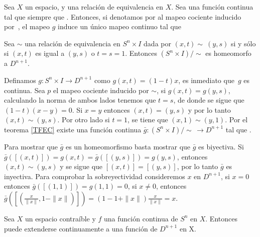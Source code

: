 \begin{Teo}\label{TFEC}
Sea $X$ un espacio, y \mm{\sim} una relación de equivalencia en
$X$. Sea  una función continua tal que
 siempre que . Entonces, si denotamos por
 al mapeo cociente inducido
por~\mm{\sim}, el mapeo $g$ induce un único mapeo continuo
 tal que 
\end{Teo}
\begin{Lema}\label{lemah}
Sea $\sim$ una relación de equivalencia en $S^n\times I$ dada por $(x,t)\sim ~(y,s)$ si y sólo si $(x,t)$ es igual a $(y,s)$ o $t \!=\! s \!=\! 1$. Entonces $(S^n\times I)/\!\!\sim$ es homeomorfo a $D^{n+1}$.
\end{Lema}
\begin{Dem}

Definamos $g\colon S^n\times I\rightarrow D^{n+1}$ como $g(x,t) =
(1-t)x$, es inmediato que~$g$ es continua. Sea $p$ el mapeo cociente inducido por $\sim$, si $g(x,t) = g(y,s)$, calculando la norma de ambos lados tenemos que  $t = s$, de donde se sigue que $(1-t)(x-y)=0$. Si $x = y$ entonces $(x,t) = (y,s)$ y por lo tanto $(x,t)\sim (y,s)$. Por otro lado si $t = 1$, se tiene que $(x,1)\sim(y,1)$.
Por el teorema \ref{TFEC} existe una función continua $\bar{g}\colon (S^n\times I)/\!\!\!\sim\,\rightarrow D^{n+1}$ tal que .

Para mostrar que $\bar{g}$ es un homeomorfismo basta mostrar que $\bar{g}$ es biyectiva.
Si  $\bar{g}([(x,t)]) =g(x,t)= \bar{g}([(y,s)]) = g(y,s)$, entonces
$(x,t)\sim (y,s)$ y se sigue que $[(x,t)] = [(y,s)]$, por lo tanto $\bar{g}$ es inyectiva.
Para comprobar la sobreyectividad consideremos $x$ en $D^{n+1}$, si $x=0$ entonces $\bar{g}([(1,1)])= g(1,1) = 0$, si $x\neq 0$, entonces $\bar{g}([(\frac{x}{\parallel x\parallel},1-\parallel x\parallel)]) = (1-1+\parallel x\parallel)\frac{x}{\parallel x\parallel} = x$. 



\end{Dem}
\begin{Teo}
Sea $X$ un espacio contraíble y $f$ una función continua de $S^n$ en $X$. Entonces  puede extenderse continuamente a una función de $D^{n+1}$ en X.
\end{Teo}
 
